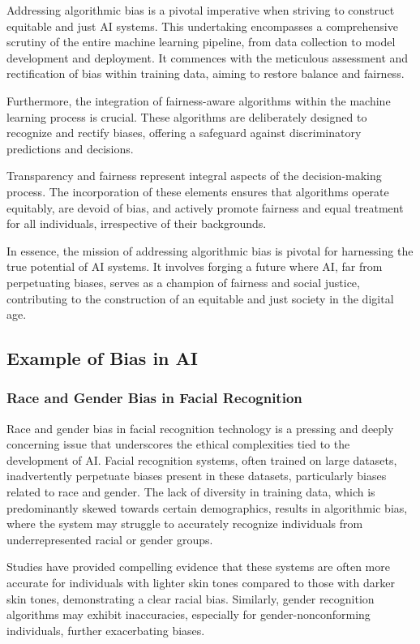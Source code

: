 \documentclass[12pt,a4paper,openright,twoside]{book}
\begin{document}
Addressing algorithmic bias is a pivotal imperative when striving to construct equitable and just AI systems. This undertaking encompasses a comprehensive scrutiny of the entire machine learning pipeline, from data collection to model development and deployment. It commences with the meticulous assessment and rectification of bias within training data, aiming to restore balance and fairness. 

Furthermore, the integration of fairness-aware algorithms within the machine learning process is crucial. These algorithms are deliberately designed to recognize and rectify biases, offering a safeguard against discriminatory predictions and decisions. 

Transparency and fairness represent integral aspects of the decision-making process. The incorporation of these elements ensures that algorithms operate equitably, are devoid of bias, and actively promote fairness and equal treatment for all individuals, irrespective of their backgrounds. 

In essence, the mission of addressing algorithmic bias is pivotal for harnessing the true potential of AI systems. It involves forging a future where AI, far from perpetuating biases, serves as a champion of fairness and social justice, contributing to the construction of an equitable and just society in the digital age.


\subsection{Example of Bias in AI}

\subsubsection{Race and Gender Bias in Facial Recognition} 

Race and gender bias in facial recognition technology is a pressing and deeply concerning issue that underscores the ethical complexities tied to the development of AI. Facial recognition systems, often trained on large datasets, inadvertently perpetuate biases present in these datasets, particularly biases related to race and gender. The lack of diversity in training data, which is predominantly skewed towards certain demographics, results in algorithmic bias, where the system may struggle to accurately recognize individuals from underrepresented racial or gender groups. \cite{https://doi.org/10.5281/zenodo.4050457}

Studies have provided compelling evidence that these systems are often more accurate for individuals with lighter skin tones compared to those with darker skin tones, demonstrating a clear racial bias. Similarly, gender recognition algorithms may exhibit inaccuracies, especially for gender-nonconforming individuals, further exacerbating biases. 
\end{document}
